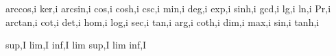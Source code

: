 \m\arccos arccos,i
\m\ker ker,i
\m\arcsin arcsin,i
\m\cos cos,i
\m\cosh cosh,i
\m\csc csc,i
\m\min min,i
\m\deg deg,i
\m\exp exp,i
\m\sinh sinh,i
\m\gcd gcd,i
\m\lg lg,i
\m\ln ln,i
\m\Pr Pr,i
\m\arctan arctan,i
\m\cot cot,i
\m\det det,i
\m\hom hom,i
\m\log log,i
\m\sec sec,i
\m\tan tan,i
\m\arg arg,i
\m\coth coth,i
\m\dim dim,i
\m\max max,i
\m\sin sin,i
\m\tanh tanh,i

\m\sup sup,I
\m\lim lim,I
\m\inf inf,I
\m\limsup lim sup,I
\m\liminf lim inf,I


\egroup
